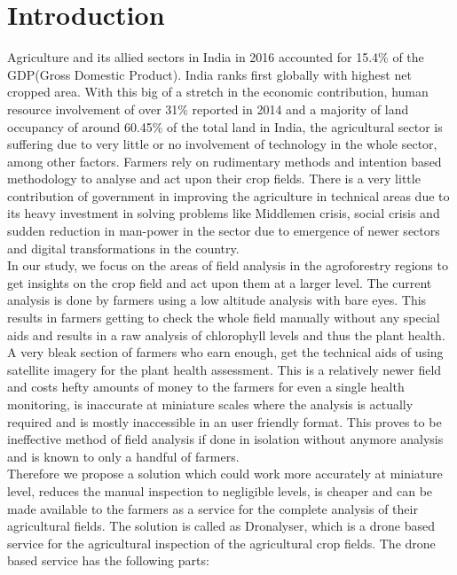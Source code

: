 
\chapter{Introduction}


Agriculture and its allied sectors in India in 2016 accounted for 15.4\%  of the GDP(Gross Domestic Product). India ranks first globally with highest net cropped area. With this big of a stretch in the economic contribution, human resource involvement of over 31\% reported in 2014 and a majority of land occupancy of around 60.45\% of the total land in India, the agricultural sector is suffering due to very little or no involvement of technology in the whole sector, among other factors. Farmers rely on rudimentary methods and intention based methodology to analyse and act upon their crop fields. There is a very little contribution of government in improving the agriculture in technical areas due to its heavy investment in solving problems like Middlemen crisis, social crisis and sudden reduction in man-power in the sector due to emergence of newer sectors and digital transformations in the country. 
\\

In our study, we focus on the areas of field analysis in the agroforestry regions to get insights on the crop field and act upon them at a larger level. The current analysis is done by farmers using a low altitude analysis with bare eyes. This results in farmers getting to check the whole field manually without any special aids and results in a raw analysis of chlorophyll  levels and thus the plant health. A very bleak section of farmers who earn enough, get the technical aids of using satellite imagery for the plant health assessment. This is a relatively newer field and costs hefty amounts of money to the farmers for even a single health monitoring, is inaccurate at miniature scales where the analysis is actually required and is mostly inaccessible in an user friendly format. This proves to be ineffective method of field analysis if done in isolation without anymore analysis and is known to only a handful of farmers.
\\

Therefore we propose a solution which could work more accurately at miniature level, reduces the manual inspection to negligible levels, is cheaper and can be made available to the farmers as a service for the complete analysis of their agricultural fields. The solution is called as Dronalyser, which is a drone based service for the agricultural inspection of the agricultural crop fields. The drone based service has the following parts:




